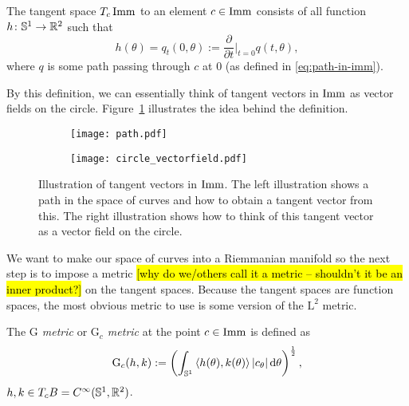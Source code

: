 \begin{definition}
  \label{def:tangt-space-of-curves}
  The tangent space $T_{c}\mathop{}\!\mathrm{Imm}$ to an element $c \in \mathop{}\!\mathrm{Imm}$ consists of all function
  $h\colon \mathbb{S}^1 \rightarrow \mathbb{R}^2$ such that
  \begin{equation*}
    h(\theta) = q_t(0, \theta) := \frac{\partial }{\partial t} \bigg\vert_{t=0} q(t,\theta),
  \end{equation*}
  where $q$ is some path passing through $c$ at 0 (as defined in \eqref{eq:path-in-imm}).
\end{definition}

By this definition, we can essentially think of tangent vectors in $\mathop{}\!\mathrm{Imm}$ as vector fields on the circle. Figure~\ref{fig:def-tang-imm} illustrates the idea behind the definition.

\begin{figure}
  \centering
  \begin{subfigure}{.49\textwidth}
    \centering
    \texttt{[image: path.pdf]}
  \end{subfigure}
  \begin{subfigure}{.49\textwidth}
    \centering
    \texttt{[image: circle\_vectorfield.pdf]}
  \end{subfigure}
  \caption{Illustration of tangent vectors in $\mathop{}\!\mathrm{Imm}$. The left illustration shows a path in the space of curves and how to obtain a tangent vector from this. The right illustration shows how to think of this tangent vector as a vector field on the circle.}
  \label{fig:def-tang-imm}
\end{figure}

We want to make our space of curves into a Riemmanian manifold so the next step is to impose a metric
\hl{[why do we/others call it a metric -- shouldn't it be an inner product?]}
on the tangent spaces. Because the tangent spaces are function spaces, the most obvious metric to use is some version of the $\mathrm{L}^2$ metric.

\begin{definition}
  The \textit{$\mathrm{G}$ metric} or \textit{$\mathrm{G}_c$ metric} at the point $c \in \mathop{}\!\mathrm{Imm}$ is defined as
  \begin{equation*}
    \mathrm{G}_c(h,k) :=
    \left(
      \int_{\mathbb{S}^{1}} \left\langle{h(\theta)
          , k(\theta)}\right\rangle |c_{\theta}| \mathop{}\!\mathrm{d} \theta
    \right)^{\frac{1}{2}},
  \end{equation*}
  $h,k \in T_cB = C^{\infty}(\mathbb{S}^1,\mathbb{R}^2)$.
\end{definition}


